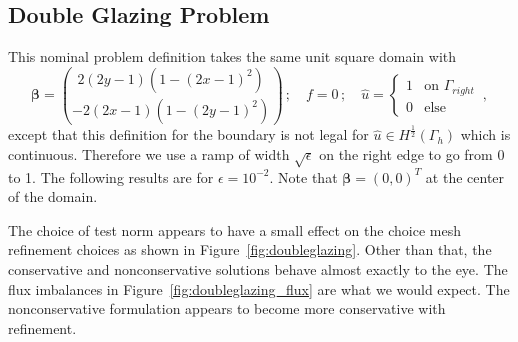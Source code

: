 \documentclass[letterpaper]{article}
\def\bbeta{\boldsymbol\beta}
\begin{document}
\subsection{Double Glazing Problem}
This nominal problem definition takes the same unit square domain with 
\[
\bbeta=\binom{2(2y-1)(1-(2x-1)^2)}{-2(2x-1)(1-(2y-1)^2)}\,;\quad f=0\,;\quad
\hat u=
\begin{cases}
1 & \mbox{on }\Gamma_{right}\\
0 & \mbox{else }
\end{cases}\,,
\]
except that this definition for the boundary is not legal for $\hat u\in
H^{\frac{1}{2}}(\Gamma_h)$ which is continuous. Therefore we use a ramp of
width $\sqrt{\epsilon}$ on the right edge to go from 0 to 1. The following
results are for $\epsilon=10^{-2}$. Note that $\bbeta=(0,0)^T$ at the center
of the domain.

The choice of test norm appears to have a small effect on the choice mesh
refinement choices as shown in Figure~\ref{fig:doubleglazing}. Other than
that, the conservative and nonconservative solutions behave almost exactly to
the eye. The flux imbalances in Figure~\ref{fig:doubleglazing_flux} are what
we would expect. The nonconservative formulation appears to become more
conservative with refinement.
\end{document}

